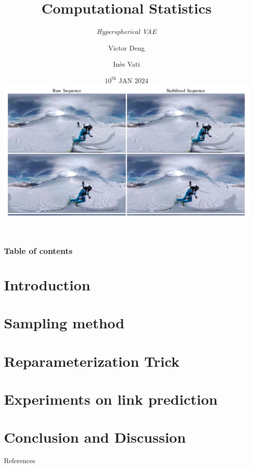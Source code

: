 \documentclass[hyperref={pdftex}]{beamer}
\title{Computational Statistics}
\subtitle{\textit{Hyperspherical VAE}}
\author{Victor Deng \and Inès Vati}
\institute[MVA]{École Normale Supérieure Paris-Saclay, Master MVA}
\date{$10^{\textrm{th}}$ JAN $2024$\\ \vspace{0.3cm} \includegraphics[scale=0.2]{figures/spherical_video.png}}
\begin{document}
\frame[plain]{\titlepage}

\begin{frame}
   \frametitle{Table of contents}
   \tableofcontents[subsectionstyle=hide]
\end{frame} 

\section{Introduction} 


\section{Sampling method}



\section{Reparameterization Trick}


\section{Experiments on link prediction}



\section{Conclusion and Discussion} 


\begin{frame}[allowframebreaks]{References}
  
\end{frame}
\end{document}
